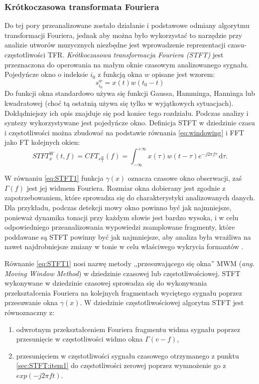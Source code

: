 \documentclass[12pt,a4paper,twoside]{mwart}
\begin{document}
\subsubsection{Krótkoczasowa transformata Fouriera}\label{sec:STFT}
Do tej pory przeanalizowane zostało działanie i podstawowe odmiany algorytmu transformacji Fouriera, jednak aby można było wykorzystać to narzędzie przy analizie utworów muzycznych niezbędne jest wprowadzenie reprezentacji czasu-częstotliwości TFR. \textit{Krótkoczasowa transformacja Fouriera (STFT)} jest przeznaczona do operowania na małym oknie czasowym analizowanego sygnału. Pojedyńcze okno o indeksie $i_0$ z funkcją okna $w$ opisane jest wzorem:
\begin{equation} \label{eq:windowing}
  s_{i_0}^w = x(t)w(t_0 - t)
\end{equation}
Do funkcji okna standardowo używa się funkcji Gaussa, Hamminga, Hanninga lub kwadratowej (choć tą ostatnią używa się tylko w wyjątkowych sytuacjach). Dokłądniejszy ich opis znajduje się pod koniec tego rozdziału. Podczas analizy i syntezy wykorzystywane jest pojedyńcze okno. Definicja STFT w dziedzinie czasu i częstotliwości można zbudować na podstawie równania \ref{eq:windowing} i FFT jako FT kolejnych okien:
\begin{equation} \label{eq:STFT1}
  STFT^{W}_{x}(t,f) = CFT_{s \frac{w}{t}}(f) = \int_{-\infty}^{+\infty} x(\tau)w(t - \tau)e^{-j2\pi f\tau}  \,\mathrm{d}\tau.
\end{equation}

W równaniu \ref{eq:STFT1} funkcja $\gamma(x)$ oznacza czasowe okno obserwacji, zaś $\Gamma(f)$ jest jej widmem Fouriera. Rozmiar okna dobierany jest zgodnie z zapotrzebowaniem, które sprowadza się do charakterystyki analizowanych danych. Dla przykładu, podczas detekcji mowy okno powinno być jak najmniejsze, ponieważ dynamika tonacji przy każdym słowie jest bardzo wysoka, i w celu odpowiedniego przeanalizowania wypowiedzi zsamplowane fragmenty, które poddawane są STFT powinny być jak najmniejsze, aby analiza była wrażliwa na nawet najdrobniejsze zmiany w tonie w celu właściwego wykrycia formantów \cite[804–816]{Transcription:Klapuri:MultipleFundamentalFrequencyEstimation}\cite[56-57, 256-258]{Transcription:Hess:PitchDetectionOfSpeechSignals}.

Równanie \ref{eq:STFT1} nosi nazwę metody ,,przesuwającego się okna'' MWM (\textit{ang. Moving Window Method}) w dziedzinie czasowej lub częstotliwościowej. STFT wykonywane w dziedzinie czasowej sprowadza się do wykonywania przekształcenia Fouriera na kolejnych fragmentach wyciętego sygnału poprzez przesuwanie okna $\gamma(x)$. W dziedzinie częstotliwościowej algorytm STFT jest równoznaczny z:
\begin{enumerate}
  \item \label{sec:STFT:item1}odwrotnym przekształceniem Fouriera fragmentu widma sygnału poprzez przesunięcie w częstotliwości widmo okna $\Gamma(v -f)$,
  \item przesunięciem w częstotliwości sygnału czasowego otrzymanego z punktu \ref{sec:STFT:item1} do częstotliwości zerowej poprzez wymnożenie go z $exp(-j2 \pi ft)$.
\end{enumerate}
\cite[455-458]{CyfrowePrzetwarzanieSygnalowOdTeoriiDoZastosowan}
\end{document}
